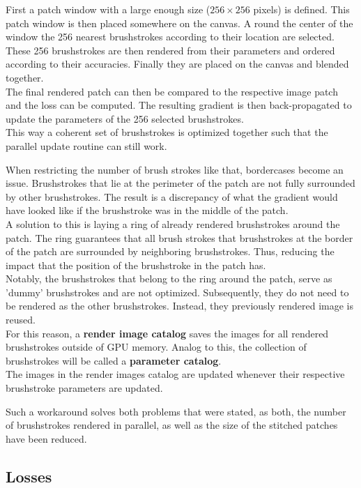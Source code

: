 First a patch window with a large enough size (\eg $256\times256$ pixels) is defined.
This patch window is then placed somewhere on the canvas.
A round the center of the window the 256 nearest brushstrokes according to their location are selected.
These 256 brushstrokes are then rendered from their parameters and ordered according to their accuracies.
Finally they are placed on the canvas and blended together.\\
The final rendered patch can then be compared to the respective image patch and the loss can be computed.
The resulting gradient is then back-propagated to update the parameters of the 256 selected brushstrokes.\\
This way a coherent set of brushstrokes is optimized together such that the parallel update routine can still work.

When restricting the number of brush strokes like that, bordercases become an issue.
Brushstrokes that lie at the perimeter of the patch are not fully surrounded by other brushstrokes.
The result is a discrepancy of what the gradient would have looked like if the brushstroke was in the middle of the patch.\\
A solution to this is laying a ring of already rendered brushstrokes around the patch.
The ring guarantees that all brush strokes that brushstrokes at the border of the patch are surrounded by neighboring brushstrokes.
Thus, reducing the impact that the position of the brushstroke in the patch has.\\
Notably, the brushstrokes that belong to the ring around the patch, serve as 'dummy' brushstrokes and are not optimized.
Subsequently, they do not need to be rendered as the other brushstrokes.
Instead, they previously rendered image is reused.\\
For this reason, a \textbf{render image catalog} saves the images for all rendered brushstrokes outside of GPU memory.
Analog to this, the collection of brushstrokes will be called a \textbf{parameter catalog}.\\
The images in the render images catalog are updated whenever their respective brushstroke parameters are updated.

Such a workaround solves both problems that were stated, as both, the number of brushstrokes rendered in parallel, as well as the size of the stitched patches have been reduced.\\

\subsection{Losses}

